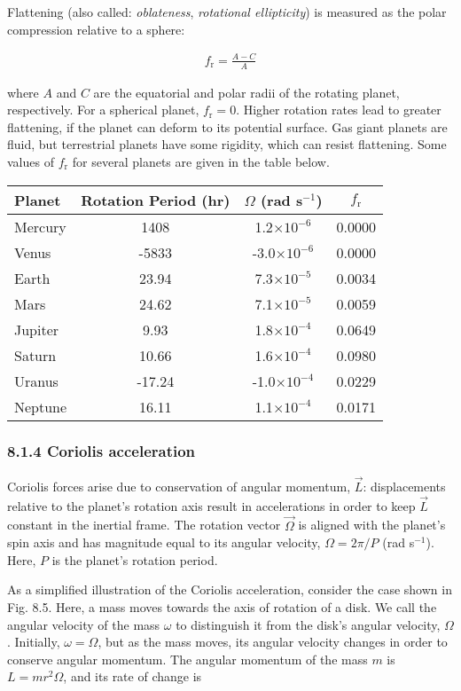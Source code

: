 \documentclass[11pt]{article}
\begin{document}
    Flattening (also called: \emph{oblateness}, \emph{rotational
ellipticity}) is measured as the polar compression relative to a sphere:

\begin{align}
    f_\mathrm{r} = \frac{A-C}{A}
\end{align}

where \(A\) and \(C\) are the equatorial and polar radii of the rotating
planet, respectively. For a spherical planet, \(f_\mathrm{r} = 0\).
Higher rotation rates lead to greater flattening, if the planet can
deform to its potential surface. Gas giant planets are fluid, but
terrestrial planets have some rigidity, which can resist flattening.
Some values of \(f_\mathrm{r}\) for several planets are given in the
table below.

\begin{longtable}[]{@{}lccc@{}}
\toprule
Planet & Rotation Period (hr) & \(\Omega\) (rad s\(^{-1}\)) &
\(f_\mathrm{r}\)\tabularnewline
\midrule
\endhead
Mercury & 1408 & 1.2\(\times 10^{-6}\) & 0.0000\tabularnewline
Venus & -5833 & -3.0\(\times 10^{-6}\) & 0.0000\tabularnewline
Earth & 23.94 & 7.3\(\times 10^{-5}\) & 0.0034\tabularnewline
Mars & 24.62 & 7.1\(\times 10^{-5}\) & 0.0059\tabularnewline
Jupiter & 9.93 & 1.8\(\times 10^{-4}\) & 0.0649\tabularnewline
Saturn & 10.66 & 1.6\(\times 10^{-4}\) & 0.0980\tabularnewline
Uranus & -17.24 & -1.0\(\times 10^{-4}\) & 0.0229\tabularnewline
Neptune & 16.11 & 1.1\(\times 10^{-4}\) & 0.0171\tabularnewline
\bottomrule
\end{longtable}

    \subsubsection{8.1.4 Coriolis acceleration}\label{coriolis-acceleration}

Coriolis forces arise due to conservation of angular momentum,
\(\vec{L}\): displacements relative to the planet's rotation axis result
in accelerations in order to keep \(\vec{L}\) constant in the inertial
frame. The rotation vector \(\vec{\Omega}\) is aligned with the planet's
spin axis and has magnitude equal to its angular velocity,
\(\Omega = 2\pi/P\) (rad s\(^{-1}\)). Here, \(P\) is the planet's
rotation period.

As a simplified illustration of the Coriolis acceleration, consider the
case shown in Fig. 8.5. Here, a mass moves towards the axis of rotation
of a disk. We call the angular velocity of the mass \(\omega\) to
distinguish it from the disk's angular velocity, \(\Omega\). Initially,
\(\omega = \Omega\), but as the mass moves, its angular velocity changes
in order to conserve angular momentum. The angular momentum of the mass
\(m\) is \(L = mr^2\Omega\), and its rate of change is
\end{document}
